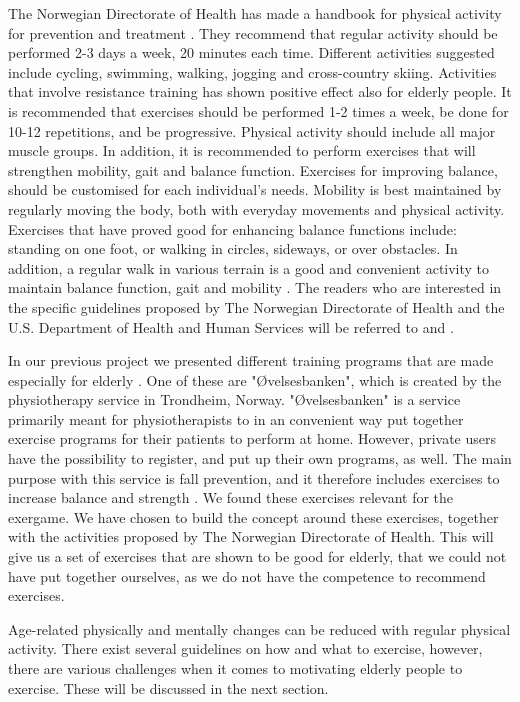 The Norwegian Directorate of Health has made a handbook for physical activity for prevention and treatment \cite{aktivitetsbok}. They recommend that regular activity should be performed 2-3 days a week, 20 minutes each time. Different activities suggested include cycling, swimming, walking, jogging and cross-country skiing. Activities that involve resistance training has shown positive effect also for elderly people. It is recommended that exercises should be performed 1-2 times a week, be done for 10-12 repetitions, and be progressive. Physical activity should include all major muscle groups. In addition, it is recommended to perform exercises that will strengthen mobility, gait and balance function. Exercises for improving balance, should be customised for each individual's needs. Mobility is best maintained by regularly moving the body, both with everyday movements and physical activity. Exercises that have proved good for enhancing balance functions include: standing on one foot, or walking in circles, sideways, or over obstacles. In addition, a regular walk in various terrain is a good and convenient activity to maintain balance function, gait and mobility \cite{aktivitetsbok}. The readers who are interested in the specific guidelines proposed by The Norwegian Directorate of Health and the U.S. Department of Health and Human Services will be referred to  \cite{aktivitetsbok} and \cite{guidelines}. 

In our previous project we presented different training programs that are made especially for elderly \cite{project}. One of these are "Øvelsesbanken", which is created by the physiotherapy service in Trondheim, Norway.  "Øvelsesbanken" is a service primarily meant for physiotherapists to in an convenient way put together exercise programs for their patients to perform at home. However, private users have the possibility to register, and put up their own programs, as well. The main purpose with this service is fall prevention, and it therefore includes exercises to increase balance and strength \cite{eldretrening}. We found these exercises relevant for the exergame. We have chosen to build the concept around these exercises, together with the activities proposed by The Norwegian Directorate of Health. This will give us a set of exercises that are shown to be good for elderly, that we could not have put together ourselves, as we do not have the competence to recommend exercises.

Age-related physically and mentally changes can be reduced with regular physical activity. There exist several guidelines on how and what to exercise, however, there are various challenges when it comes to motivating elderly people to exercise. These will be discussed in the next section. 

